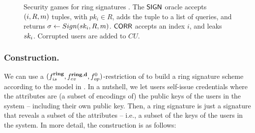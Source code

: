 \begin{figure}[ht!]
  \centering
  \caption{Security games for ring signatures \cite{bkm06}. The $\mathsf{SIGN}$
    oracle accepts $(i,R,m)$ tuples, with $pk_i \in R$, adds the tuple to a
    list of queries, and returns $\sigma \gets Sign(sk_i,R,m)$.
    $\mathsf{CORR}$ accepts an index $i$, and leaks $sk_i$. Corrupted users are
    added to $CU$.}
  \label{fig:model-rs}  
\end{figure}


\subsubsection{\CUASRing Construction.} %
We can use a $(f_{is}^{\mathbf{ring}},f_{ev}^{\mathbf{ring},\mathbf{d}},f_{op}^0)$-restriction
of \CUASGenHideIss to build a ring signature scheme according to the model
in . In a nutshell, we let users self-issue
credentials where the attributes are (a subset of encodings of) the public keys
of the users in the system -- including their own public key. Then, a ring
signature is just a \CUASGenHideIss signature that reveals a subset of
the attributes -- i.e., a subset of the keys of the users in the system. In more
detail, the construction is as follows:

